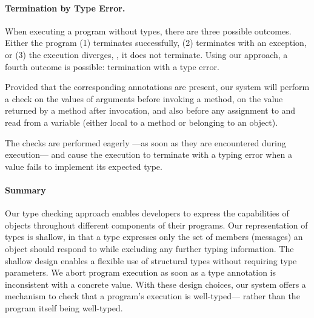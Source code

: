 

\paragraph{Termination by Type Error.}
\label{sec:term-type-error}

When executing a program without types, there are three possible outcomes.
Either the program (1) terminates successfully,
(2) terminates with an exception, or 
(3) the execution diverges, \ie, it does not terminate.
Using our approach, a
fourth outcome is possible: termination with a type error.

Provided that the corresponding annotations are present, 
our system will perform a check
on the values of arguments before invoking a method, 
on the value returned by a method after invocation, and
also before any assignment to and read from a variable 
(either local to a method or belonging to an object). 

The checks are performed eagerly%
---as soon as they are encountered during execution---%
and cause the execution to terminate with a typing error 
when a value fails to implement its expected type.

\paragraph{Summary}
Our type checking approach enables developers to express
the capabilities of objects throughout different components of 
their programs.
Our representation of types is shallow,
in that a type expresses only the set of members (messages) an object
should respond to while excluding any further typing information. 
The shallow design enables a flexible use of structural types without
requiring type parameters.
We abort program execution as soon as
a type annotation is inconsistent with a concrete value. 
With these design choices, our system offers a mechanism to check that a program's execution
is well-typed---%
rather than the program itself being well-typed.


